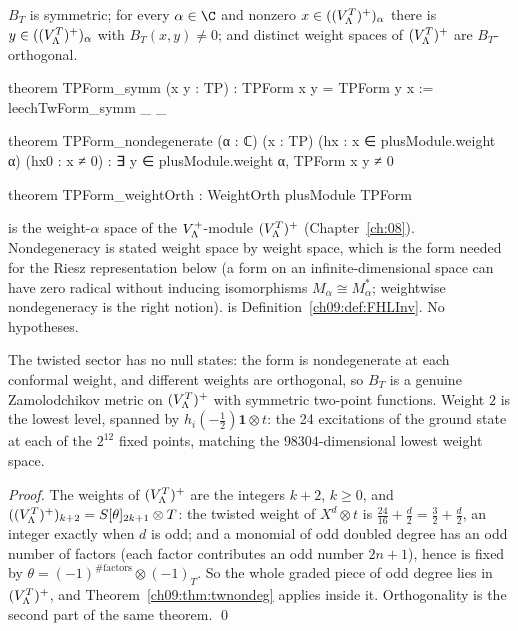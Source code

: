 \begin{theorem}\label{ch09:thm:TPForm}
$B_T$ is symmetric; for every $\alpha\in\C$ and nonzero $x\in((V_{\Lambda}^{T})^{+})_\alpha$ there is
$y\in((V_{\Lambda}^{T})^{+})_\alpha$ with $B_T(x,y)\neq0$; and distinct weight spaces of $(V_{\Lambda}^{T})^{+}$ are
$B_T$-orthogonal.
\end{theorem}
\begin{leancode}
theorem TPForm_symm (x y : TP) : TPForm x y = TPForm y x := leechTwForm_symm _ _

theorem TPForm_nondegenerate (α : ℂ) (x : TP) (hx : x ∈ plusModule.weight α) (hx0 : x ≠ 0) :
    ∃ y ∈ plusModule.weight α, TPForm x y ≠ 0

theorem TPForm_weightOrth : WeightOrth plusModule TPForm
\end{leancode}
\begin{dictionary}
 is the weight-$\alpha$ space of the $V_{\Lambda}^{+}$-module $(V_{\Lambda}^{T})^{+}$
(Chapter~\ref{ch:08}). Nondegeneracy is stated weight space by weight space, which is the form
needed for the Riesz representation below (a form on an infinite-dimensional space can have zero
radical without inducing isomorphisms $M_\alpha\cong M_\alpha^*$; weightwise nondegeneracy is the
right notion).  is Definition~\ref{ch09:def:FHLInv}. No hypotheses.
\end{dictionary}
\begin{physics}
The twisted sector has no null states: the form is nondegenerate at each conformal weight, and different weights are orthogonal, so $B_T$ is a genuine Zamolodchikov metric on $(V_{\Lambda}^{T})^{+}$ with symmetric two-point functions. Weight $2$ is the lowest level, spanned by $h_i(-\tfrac12)\mathbf1\otimes t$: the 24 excitations of the ground state at each of the $2^{12}$ fixed points, matching the $98304$-dimensional lowest weight space.
\end{physics}

\noindent\emph{Proof.} The weights of $(V_{\Lambda}^{T})^{+}$ are the integers $k+2$, $k\ge0$, and
$((V_{\Lambda}^{T})^{+})_{k+2}=S[\theta]_{2k+1}\otimes T$: the twisted weight of $X^d\otimes t$ is
$\frac{24}{16}+\frac d2=\frac32+\frac d2$, an integer exactly when $d$ is odd; and a monomial of odd
doubled degree has an odd number of factors (each factor contributes an odd number $2n+1$), hence
is fixed by $\theta=(-1)^{\#\text{factors}}\otimes(-1)_T$. So the whole graded piece of odd degree
lies in $(V_{\Lambda}^{T})^{+}$, and Theorem~\ref{ch09:thm:twnondeg} applies inside it. Orthogonality is the
second part of the same theorem. \qed

